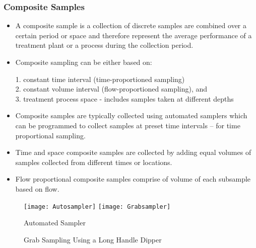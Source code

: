 \subsubsection{Composite Samples}
				\begin{itemize}
					\item A composite sample is a collection of discrete samples are combined over a certain period or space and therefore represent the average performance of a treatment plant or a process during the collection period.\\  
					\item Composite sampling can be either based on:
					      
					      1. constant time interval (time-proportioned sampling)\\
					      2. constant volume interval (flow-proportioned sampling), and\\
					      3. treatment process space - includes samples taken at different depths \\
					      
					\item Composite samples are typically collected using automated samplers which can be programmed to collect samples at preset time intervals – for time proportional sampling.
					\item Time and space composite samples are collected by adding equal volumes of samples collected from different times or locations.  
					\item Flow proportional composite samples comprise of volume of each subsample based on flow.\\  
				\end{itemize}
	\begin{figure}			
			\begin{center}
				\texttt{[image: Autosampler]} \hspace{2cm} \texttt{[image: Grabsampler]}\\
			\end{center}
			\hspace{2.3cm} Automated Sampler \hspace{2.0cm} \parbox{\textwidth}{Grab Sampling Using a Long Handle Dipper}\\
\end{figure}

